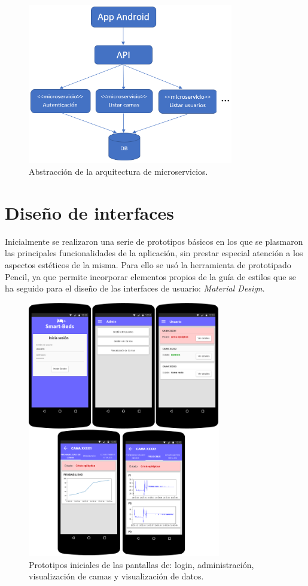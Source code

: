\begin{figure}[H]
	\centering
	\includegraphics[width=0.8\textwidth]{../img/microservicios.png}
	\caption{Abstracción de la arquitectura de microservicios.}
	\label{fig:microservicios}
\end{figure}

\section{Diseño de interfaces}

Inicialmente se realizaron una serie de prototipos básicos en los que se plasmaron las principales funcionalidades de la aplicación, sin prestar especial atención a los aspectos estéticos de la misma. Para ello se usó la herramienta de prototipado Pencil, ya que permite incorporar elementos propios de la guía de estilos que se ha seguido para el diseño de las interfaces de usuario: \textit{Material Design}. 

\begin{figure}[H]
	\centering
	\includegraphics[width=0.75\textwidth]{../img/prototipos.png}
	\caption{Prototipos iniciales de las pantallas de: login, administración, visualización de camas y visualización de datos.}
	\label{fig:prototipos}
\end{figure}
